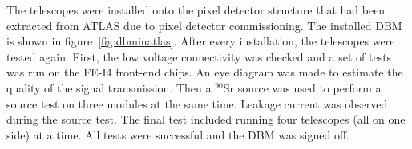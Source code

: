 The telescopes were installed onto the pixel detector structure that had been extracted from ATLAS due to pixel detector commissioning. The installed DBM is shown in figure~\ref{fig:dbminatlas}.
After every installation, the telescopes were tested again. First, the low voltage connectivity was checked and a set of tests was run on the FE-I4 front-end chips. An eye diagram was made to estimate the quality of the signal transmission. Then a $^{90}$Sr source was used to perform a source test on three modules at the same time. Leakage current was observed during the source test. The final test included running four telescopes (all on one side) at a time. All tests were successful and the DBM was signed off.

